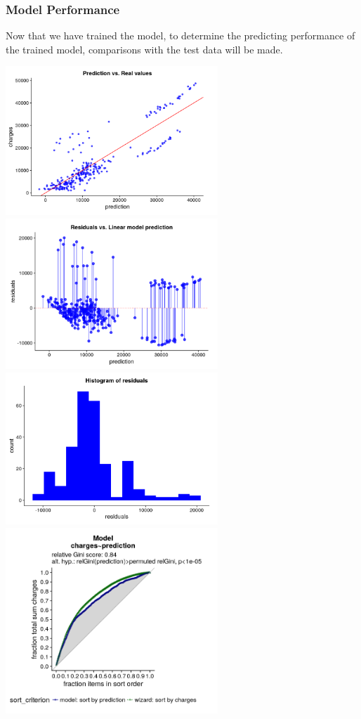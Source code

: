 \documentclass[a4paper]{article}
\begin{document}
\subsubsection{Model Performance}
Now that we have trained the model, to determine the predicting performance of the trained model, comparisons with the test data will be made.
\begin{center}
\includegraphics[width=8cm]{img/1.png}\includegraphics[width=8cm]{img/2.png}
\includegraphics[width=8cm]{img/3.png}\includegraphics[width=8cm]{img/4.png}
\end{center}
\end{document}
